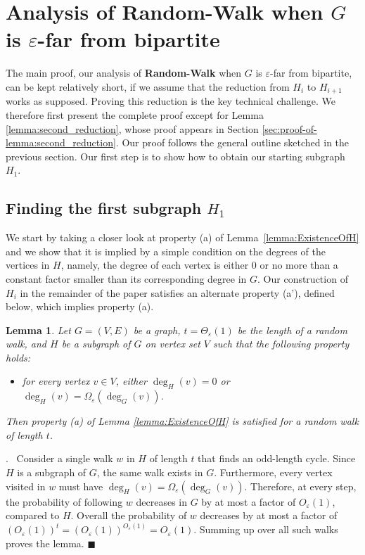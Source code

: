 \documentclass[11pt]{article}
\newenvironment{proof}{\noindent {\bf Proof}.\ }{\qed \par\vskip 4mm\par}
\newtheorem{lemma}[theorem]{Lemma}
\newcommand{\sq}{\hbox{\rlap{$\sqcap$}$\sqcup$}}
\newcommand{\qed}{\hspace*{\fill}\sq}
\renewcommand{\qed}{\hspace*{\fill}\ensuremath{\blacksquare}}
\newcommand{\eps}{\ensuremath{\epsilon}}
\def\epsilon{\ensuremath{\varepsilon}}
\newcommand{\RW}{{\bf Random-Walk}}
\begin{document}
\section{Analysis of \RW{} when $G$ is $\epsilon$-far from bipartite}
\label{sec:main-proof}

The main proof, our analysis of \RW{} when $G$ is $\epsilon$-far from bipartite, can be kept relatively short, if we assume that the reduction from $H_i$ to $H_{i+1}$ works as supposed. Proving this reduction is the key technical challenge. We therefore first present the complete proof except for Lemma \ref{lemma:second_reduction}, whose proof appears in Section \ref{sec:proof-of-lemma:second_reduction}. Our proof follows the general outline sketched in the previous section. Our first step is to show how to obtain our starting subgraph $H_1$.



\subsection{Finding the first subgraph $H_1$}
\label{subsec:constructing-H1}

We start by taking a closer look at property (a) of Lemma~\ref{lemma:ExistenceOfH} and we show that it is implied by a simple condition on the degrees of the vertices in $H$, namely, the degree of each vertex is either $0$ or no more than a constant factor smaller than its corresponding degree in $G$. Our construction of $H_i$ in the remainder of the paper satisfies an alternate property (a'), defined below, which implies property (a).

\begin{lemma}
\label{lemma:basic}
Let $G = (V,E)$ be a graph, $t=\Theta_{\eps}(1)$ be the length of a random walk, and $H$ be a subgraph of $G$ on vertex set $V$ such that the following property holds:
\begin{itemize}
\item[(a')] for every vertex $v\in V$, either $\deg_H(v) = 0$ or $\deg_H(v) = \Omega_{\eps}(\deg_G(v))$.
\end{itemize}
Then property (a) of Lemma \ref{lemma:ExistenceOfH} is satisfied for a random walk of length $t$.
\end{lemma}

\begin{proof}
Consider a single walk $w$ in $H$ of length $t$ that finds an odd-length cycle. Since $H$ is a subgraph of $G$, the same walk exists in $G$. Furthermore, every vertex visited in $w$ must have $\deg_H(v) = \Omega_{\eps}(\deg_G(v))$. Therefore, at every step, the probability of following $w$ decreases in $G$ by at most a factor of $O_\eps(1)$, compared to $H$. Overall the probability of $w$ decreases by at most a factor of $\left(O_\eps(1)\right)^t = \left(O_\eps(1)\right)^{O_\eps(1)} =  O_\eps(1)$. Summing up over all such walks proves the lemma.
\end{proof}
\end{document}
